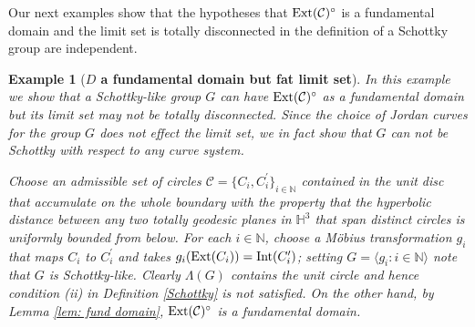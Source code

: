 \documentclass[12pt]{amsart}
\theoremstyle{plain}
\newtheorem{exam}[thm]{Example}
\DeclareMathOperator{\Int}{\rm Int}
\DeclareMathOperator{\Ext}{\rm Ext}
\begin{document}
Our next examples show that the  hypotheses that 
$\Ext (\mathcal{C})^{\circ}$  is  a fundamental domain  and the  limit set is  totally disconnected 
  in the definition of a Schottky group are independent. 


\begin{exam}[{\bf $D$ a fundamental domain but fat limit set}]
{\rm In this example we show that a Schottky-like group $G$ can have $\Ext (\mathcal{C})^{\circ}$  as   a fundamental domain but its limit set may not be totally disconnected. Since the choice of Jordan curves for the group $G$ does not effect the limit set, we in fact show that $G$ can not be Schottky with respect to any curve system. 

Choose an admissible  set of  circles 
$\mathcal{C}=\{C_i ,C_i ^{\prime}\}_{i \in \mathbb N}$ contained in the unit disc that accumulate on the  whole boundary  with the property that the hyperbolic distance between any two totally geodesic planes 
in $\mathbb H^3$ that span distinct circles is uniformly bounded from below. For each $ {i \in \mathbb N}$, choose a  M\"obius transformation $g_{i}$ that maps $C_i$ to $C_i ^{\prime}$ and takes $g_i(\Ext(C_i))=\Int( C_i^{\prime})$; setting 
$G=\langle g_i : i \in \mathbb N\rangle$ note that $G$ is Schottky-like. Clearly 
$\Lambda (G)$ contains the unit circle and hence condition (ii) in 
Definition \ref{Schottky} 
is not satisfied.  On the other hand, by
Lemma \ref{lem: fund domain}, $\Ext (\mathcal{C})^{\circ}$ is a fundamental domain. }
\end{exam}
\end{document}
